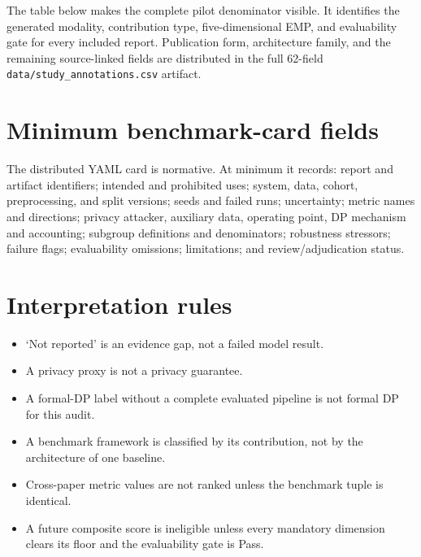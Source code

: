 \documentclass[11pt,letterpaper]{article}
\begin{document}
The table below makes the complete pilot denominator visible. It identifies the generated modality, contribution type, five-dimensional EMP, and evaluability gate for every included report. Publication form, architecture family, and the remaining source-linked fields are distributed in the full 62-field \texttt{data/study\_annotations.csv} artifact.

\begingroup
\scriptsize
\setlength{\tabcolsep}{4.5pt}

\endgroup

\section{Minimum benchmark-card fields}

The distributed YAML card is normative. At minimum it records: report and artifact identifiers; intended and prohibited uses; system, data, cohort, preprocessing, and split versions; seeds and failed runs; uncertainty; metric names and directions; privacy attacker, auxiliary data, operating point, DP mechanism and accounting; subgroup definitions and denominators; robustness stressors; failure flags; evaluability omissions; limitations; and review/adjudication status.

\section{Interpretation rules}

\begin{itemize}
    \item `Not reported' is an evidence gap, not a failed model result.
    \item A privacy proxy is not a privacy guarantee.
    \item A formal-DP label without a complete evaluated pipeline is not formal DP for this audit.
    \item A benchmark framework is classified by its contribution, not by the architecture of one baseline.
    \item Cross-paper metric values are not ranked unless the benchmark tuple is identical.
    \item A future composite score is ineligible unless every mandatory dimension clears its floor and the evaluability gate is Pass.
\end{itemize}



\end{document}
